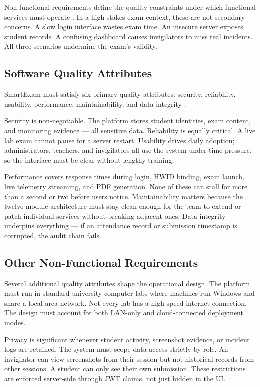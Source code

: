 Non-functional requirements define the quality constraints under which functional services must operate \cite{iso25010}. In a high-stakes exam context, these are not secondary concerns. A slow login interface wastes exam time. An insecure server exposes student records. A confusing dashboard causes invigilators to miss real incidents. All three scenarios undermine the exam's validity.

\subsection{Software Quality Attributes}

SmartExam must satisfy six primary quality attributes: security, reliability, usability, performance, maintainability, and data integrity \cite{iso25010}.

Security is non-negotiable. The platform stores student identities, exam content, and monitoring evidence — all sensitive data. Reliability is equally critical. A live lab exam cannot pause for a server restart. Usability drives daily adoption; administrators, teachers, and invigilators all use the system under time pressure, so the interface must be clear without lengthy training.

Performance covers response times during login, HWID binding, exam launch, live telemetry streaming, and PDF generation. None of these can stall for more than a second or two before users notice. Maintainability matters because the twelve-module architecture must stay clean enough for the team to extend or patch individual services without breaking adjacent ones. Data integrity underpins everything — if an attendance record or submission timestamp is corrupted, the audit chain fails.

\subsection{Other Non-Functional Requirements}

Several additional quality attributes shape the operational design. The platform must run in standard university computer labs where machines run Windows and share a local area network. Not every lab has a high-speed internet connection. The design must account for both LAN-only and cloud-connected deployment modes.

Privacy is significant whenever student activity, screenshot evidence, or incident logs are retained. The system must scope data access strictly by role. An invigilator can view screenshots from their session but not historical records from other sessions. A student can only see their own submission. These restrictions are enforced server-side through JWT claims, not just hidden in the UI.


